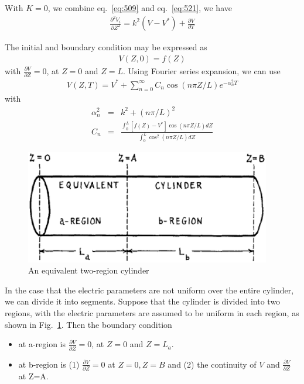 With $K=0$, we combine eq.~\eqref{eq:509} and eq.~\eqref{eq:521}, we
have
\begin{eqnarray}
  \label{eq:503}
  \frac{\partial^2 V_i}{\partial Z^2}  = k^2 (V-V^*) + \frac{\partial
    V}{\partial T}
\end{eqnarray}

The initial and boundary condition may be expressed as
\begin{eqnarray}
  \label{eq:524}
  V(Z,0) = f(Z)
\end{eqnarray}
with $\frac{\partial V}{\partial Z} = 0$, at $Z=0$ and $Z=L$. Using
Fourier series expansion, we can use
\begin{eqnarray}
  \label{eq:525}
  V(Z,T) = V^* + \sum_{n=0}^\infty C_n \cos(n\pi Z/L)e^{-\alpha_n^2T}
\end{eqnarray}
with
\begin{eqnarray}
  \label{eq:526}
  \alpha_n^2 &=& k^2 + (n\pi/L)^2 \\
  C_n &=& \frac{\int_0^L [f(Z)-V^*]\cos (n\pi Z/L) dZ}{\int_0^L
    \cos^2(n\pi Z/L) dZ}
\end{eqnarray}



\begin{figure}[hbt]
  \centerline{\includegraphics[height=5cm,
    angle=0]{./images/Z_cylinder_2.eps}}
\caption{An equivalent two-region cylinder}
\label{fig:two-region-cylinder}
\end{figure}

In the case that the electric parameters are not uniform over the
entire cylinder, we can divide it into segments. Suppose that the
cylinder is divided into two regions, with the electric parameters are
assumed to be uniform in each region, as shown in
Fig.~\ref{fig:two-region-cylinder}. Then the boundary condition 
\begin{itemize}
\item at a-region is $\frac{\partial V}{\partial Z} = 0$, at $Z=0$ and
  $Z=L_a$.

\item at b-region is (1) $\frac{\partial V}{\partial Z}= 0$ at $Z=0,
  Z=B$ and (2) the continuity of $V$ and $\frac{\partial
    V}{\partial Z}$ at Z=A.

\end{itemize}

